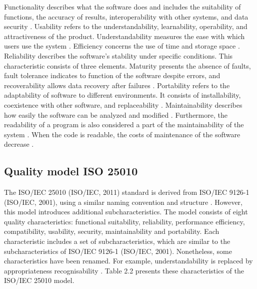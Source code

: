 Functionality describes what the software does and includes the suitability of functions, the accuracy of results, interoperability with other systems, and data security \cite{spinellis2006code}. Usability refers to the understandability, learnability, operability, and attractiveness of the product. Understandability measures the ease with which users use the system \cite{dugalic2012iso}. Efficiency concerns the use of time and storage space \cite{dugalic2012iso}. Reliability describes the software’s stability under specific conditions. This characteristic consists of three elements. Maturity presents the absence of faults, fault tolerance indicates to function of the software despite errors, and recoverability allows data recovery after failures \cite{spinellis2006code}. Portability refers to the adaptability of software to different environments. It consists of installability,  coexistence with other software, and replaceability \cite{spinellis2006code}. Maintainability describes how easily the software can be analyzed and modified \cite{spinellis2006code}. Furthermore, the readability of a program is also considered a part of the maintainability of the system \cite{buse2009learning}.  When the code is readable, the costs of maintenance of the software decrease \cite{sedano2016code}.





\subsection{Quality model ISO 25010 }


The ISO/IEC 25010 (ISO/IEC, 2011) standard is derived from ISO/IEC 9126-1 (ISO/IEC, 2001), using a similar naming convention and structure \cite{zapata2013development}. However, this model introduces additional subcharacteristics. The model consists of eight quality characteristics: functional suitability, reliability, performance efficiency, compatibility, usability, security, maintainability and portability.  
Each characteristic includes a set of subcharacteristics, which are similar to the subcharacteristics of ISO/IEC 9126-1 (ISO/IEC, 2001). Nonetheless, some characteristics  have been renamed. For example, understandability is replaced by appropriateness recognisability \cite{zapata2013development}. Table 2.2 presents these characteristics of the ISO/IEC 25010 model.


